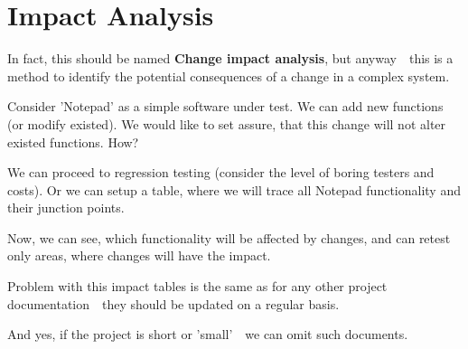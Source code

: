 \section{Impact Analysis}
\label{sec:Impact Analysis}

In fact, this should be named \textbf{Change impact analysis}, but anyway~\textemdash~this is a method to identify the potential consequences of a change in a complex system.

Consider 'Notepad' as a simple software under test. We can add new functions (or modify existed). We would like to set assure, that this change will not alter existed functions. How?

We can proceed to regression testing (consider the level of boring testers and costs). Or we can setup a table, where we will trace all Notepad functionality and their junction points.

Now, we can see, which functionality will be affected by changes, and can retest only areas, where changes will have the impact.

Problem with this impact tables is the same as for any other project documentation~\textemdash~they should be updated on a regular basis.

And yes, if the project is short or 'small'~\textemdash~we can omit such documents.
